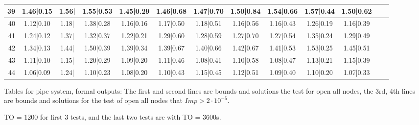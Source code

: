 \begin{table}
\begin{tabular}{|r||c|c|c|c|c|c|c|c|c|c|c|c|}
39 &1.46|0.15 &1.56| &1.55|0.53 &1.45|0.29 &1.46|0.68 &1.47|0.70 &1.50|0.84 &1.54|0.66 &1.57|0.44 &1.50|0.62  \\\hline
40 &1.12|0.10 &1.18| &1.38|0.28 &1.16|0.16 &1.17|0.50 &1.18|0.51 &1.16|0.56 &1.16|0.43 &1.26|0.19 &1.16|0.39  \\\hline
41 &1.24|0.12 &1.37| &1.32|0.37 &1.22|0.21 &1.29|0.60 &1.28|0.59 &1.27|0.70 &1.27|0.54 &1.35|0.24 &1.29|0.49  \\\hline
42 &1.34|0.13 &1.44| &1.50|0.39 &1.39|0.34 &1.39|0.67 &1.40|0.66 &1.42|0.67 &1.41|0.53 &1.53|0.25 &1.45|0.51  \\\hline
43 &1.11|0.10 &1.15| &1.20|0.29 &1.09|0.20 &1.11|0.46 &1.08|0.41 &1.10|0.58 &1.08|0.47 &1.13|0.21 &1.15|0.39  \\\hline
44 &1.06|0.09 &1.24| &1.10|0.23 &1.08|0.20 &1.10|0.43 &1.15|0.45 &1.12|0.51 &1.09|0.40 &1.10|0.20 &1.07|0.33  \\\hline
	\end{tabular}
\end{table}

\clearpage

Tables for pipe system, formal outputs: The first and second lines are bounds and solutions the test for open all nodes, the 3rd, 4th lines are bounds and solutions for the test of open all nodes that $Imp > 2\cdot10^{-5}$.

TO = 1200 for first 3 tests, and the last two tests are with TO = 3600s.




